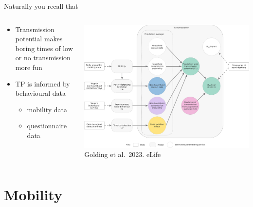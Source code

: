 \documentclass[
  ignorenonframetext,
]{beamer}
\providecommand{\tightlist}{%
  \setlength{\itemsep}{0pt}\setlength{\parskip}{0pt}}\usepackage{longtable,booktabs,array}
\begin{document}
\begin{frame}{Naturally you recall that}
\label{naturally-you-recall-that-2}
\begin{columns}[T]
\begin{column}{0.4\textwidth}
\begin{itemize}
\tightlist
\item
  Transmission potential makes boring times of low or no transmission
  more fun
\item
  TP is informed by behavioural data

  \begin{itemize}
  \tightlist
  \item
    mobility data
  \item
    questionnaire data
  \end{itemize}
\end{itemize}
\end{column}

\begin{column}{0.7\textwidth}
\includegraphics{images/tp_model_schema.jpg} Golding et al.~2023. eLife
\end{column}
\end{columns}
\end{frame}

\section{Mobility}\label{mobility}
\end{document}
